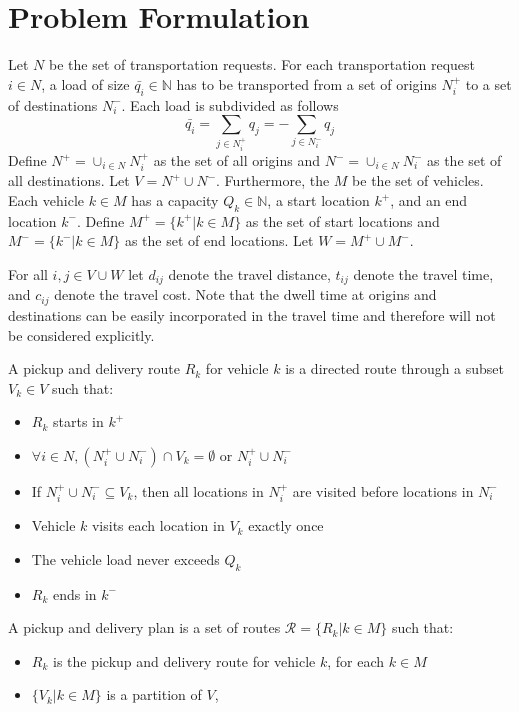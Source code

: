 			\section{Problem Formulation}
				Let $N$ be the set of transportation requests. For each transportation request $i \in N$, a load of size $\bar{q_i} \in \mathbb{N}$ has to be transported from a set of origins $N_i^+$ to a set of destinations $N_i^-$. Each load is subdivided as follows
				\begin{equation}
					\bar{q_i} = \sum_{j \in N_i^+} q_j = -\sum_{j \in N_i^-} q_j
				\end{equation}
				Define $N^+ = \cup_{i \in N} N_i^+$ as the set of all origins and $N^- = \cup_{i \in N}N_i^-$ as the set of all destinations. Let $V = N^+ \cup N^-$. Furthermore, the $M$ be the set of vehicles. Each vehicle $k \in M$ has a capacity $Q_k \in \mathbb{N}$, a start location $k^+$, and an end location $k^-$. Define $M^+ = \{k^+|k\in M\}$ as the set of start locations and $M^- = \{k^-|k\in M\}$ as the set of end locations. Let $W = M^+ \cup M^-$.

				For all $i, j \in V\cup W$ let $d_{ij}$ denote the travel distance, $t_{ij}$ denote the travel time, and $c_{ij}$ denote the travel cost. Note that the dwell time at origins and destinations can be easily incorporated in the travel time and therefore will not be considered explicitly.

				\begin{definition}
					A pickup and delivery route $R_k$ for vehicle $k$ is a directed route through a subset $V_k \in V$ such that:
					\begin{itemize}
						\item $R_k$ starts in $k^+$
						\item $\forall i \in N, (N_i^+ \cup N_i^-) \cap V_k = \emptyset \text{ or } N_i^+ \cup N_i^-$
						\item If $N_i^+ \cup N_i^- \subseteq V_k$, then all locations in $N_i^+$ are visited before locations in $N_i^-$
						\item Vehicle $k$ visits each location in $V_k$ exactly once
						\item The vehicle load never exceeds $Q_k$
						\item $R_k$ ends in $k^-$
					\end{itemize}
				\end{definition}

				\begin{definition}
					A pickup and delivery plan is a set of routes $\mathcal{R} = \{R_k |k \in M\}$ such that:
					\begin{itemize}
						\item $R_k$ is the pickup and delivery route for vehicle $k$, for each $k \in M$
						\item $\{V_k |k \in M\}$ is a partition of $V$,
					\end{itemize}
				\end{definition}


